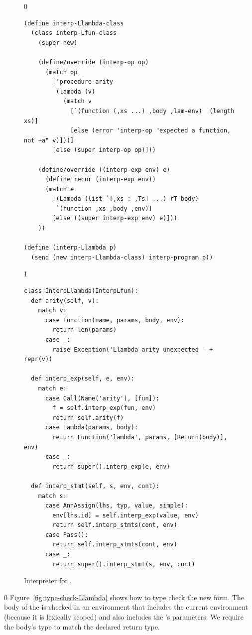 \documentclass[7x10]{TimesAPriori_MIT}%
\def\racketEd{0}
\def\pythonEd{1}
\providecommand{\BookEdition}{1}
\let\edition\BookEdition
\newcommand{\pythonColor}[0]{}
\numberwithin{theorem}{chapter}
\numberwithin{definition}{chapter}
\numberwithin{equation}{chapter}
\begin{document}
\begin{figure}[tbp]
  \begin{tcolorbox}[colback=white]
    {\if\edition\racketEd 
\begin{lstlisting}
(define interp-Llambda-class
  (class interp-Lfun-class
    (super-new)

    (define/override (interp-op op)
      (match op
        ['procedure-arity
         (lambda (v)
           (match v
             [`(function (,xs ...) ,body ,lam-env)  (length xs)]
             [else (error 'interp-op "expected a function, not ~a" v)]))]
        [else (super interp-op op)]))

    (define/override ((interp-exp env) e)
      (define recur (interp-exp env))
      (match e
        [(Lambda (list `[,xs : ,Ts] ...) rT body)
         `(function ,xs ,body ,env)]
        [else ((super interp-exp env) e)]))
    ))

(define (interp-Llambda p)
  (send (new interp-Llambda-class) interp-program p))
\end{lstlisting}
\fi}
{\if\edition\pythonEd\pythonColor
\begin{lstlisting}
class InterpLlambda(InterpLfun):
  def arity(self, v):
    match v:
      case Function(name, params, body, env):
        return len(params)
      case _:
        raise Exception('Llambda arity unexpected ' + repr(v))
      
  def interp_exp(self, e, env):
    match e:
      case Call(Name('arity'), [fun]):
        f = self.interp_exp(fun, env)
        return self.arity(f)
      case Lambda(params, body):
        return Function('lambda', params, [Return(body)], env)
      case _:
        return super().interp_exp(e, env)
    
  def interp_stmt(self, s, env, cont):
    match s:
      case AnnAssign(lhs, typ, value, simple):
        env[lhs.id] = self.interp_exp(value, env)
        return self.interp_stmts(cont, env)
      case Pass():
        return self.interp_stmts(cont, env)
      case _:
        return super().interp_stmt(s, env, cont)
\end{lstlisting}
\fi}
  \end{tcolorbox}

  \caption{Interpreter for \LangLam{}.}
\label{fig:interp-Llambda}
\end{figure}


{\if\edition\racketEd
%
Figure~\ref{fig:type-check-Llambda} shows how to type check the new
 form. The body of the  is checked in an
environment that includes the current environment (because it is
lexically scoped) and also includes the 's parameters.  We
require the body's type to match the declared return type.
%
\fi}
\end{document}
